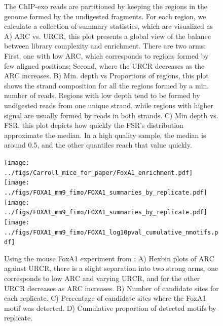 \documentclass{bmcart}\usepackage[]{graphicx}\usepackage[]{color}
\begin{document}
\begin{figure}[h!]
  \caption{The ChIP-exo reads are partitioned by keeping the regions
    in the genome formed by the undigested fragments. For each region,
    we calculate a collection of summary statistics, which are
    visualized as A) ARC vs. URCR, this plot presents a global view of
    the balance between library complexity and enrichment. There are
    two arms: First, one with low ARC, which corresponds to regions
    formed by few aligned positions; Second, where the URCR decreases
    as the ARC increases. B) Min. depth vs Proportions of regions,
    this plot shows the strand composition for all the regions formed
    by a min. number of reads. Regions with low depth tend to be
    formed by undigested reads from one unique strand, while regions
    with higher signal are usually formed by reads in both strands. C)
    Min depth vs. FSR, this plot depicts how quickly the FSR's
    distribution approximate the median. In a high quality sample, the
    median is around 0.5, and the other quantiles reach that value
    quickly.}
  \label{fig:qcdiagram}
\end{figure}

\newpage

\begin{figure}[h!]
  \centering
  \texttt{[image: ../figs/Carroll\_mice\_for\_paper/FoxA1\_enrichment.pdf]}
  \newline
  \texttt{[image: ../figs/FOXA1\_mm9\_fimo/FOXA1\_summaries\_by\_replicate.pdf]}
  \texttt{[image: ../figs/FOXA1\_mm9\_fimo/FOXA1\_summaries\_by\_replicate.pdf]}
  \texttt{[image: ../figs/FOXA1\_mm9\_fimo/FOXA1\_log10pval\_cumulative\_nmotifs.pdf]}
  \caption{Using the mouse FoxA1 experiment from \cite{exoillumina}:
    A) Hexbin plots of $\mbox{ARC}$ against $\mbox{URCR}$, there is a
    slight separation into two strong arms, one corresponds to low
    $\mbox{ARC}$ and varying $\mbox{URCR}$, and for the other
    $\mbox{URCR}$ decreases as $\mbox{ARC}$ increases. B) Number of
    candidate sites for each replicate. C) Percentage of candidate
    sites where the FoxA1 motif was detected. D) Cumulative
    proportion of detected motifs by replicate.}
  \label{fig:enrich}
\end{figure}

\newpage
\end{document}
